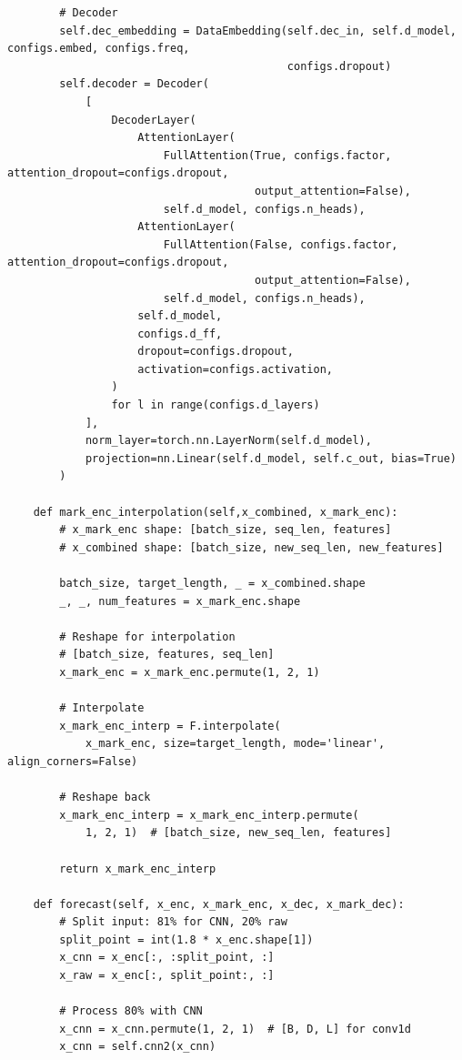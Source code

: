 \documentclass[stu,12pt,floatsintext]{apa7}
\begin{document}
\begin{verbatim}
        # Decoder
        self.dec_embedding = DataEmbedding(self.dec_in, self.d_model, configs.embed, configs.freq,
                                           configs.dropout)
        self.decoder = Decoder(
            [
                DecoderLayer(
                    AttentionLayer(
                        FullAttention(True, configs.factor, attention_dropout=configs.dropout,
                                      output_attention=False),
                        self.d_model, configs.n_heads),
                    AttentionLayer(
                        FullAttention(False, configs.factor, attention_dropout=configs.dropout,
                                      output_attention=False),
                        self.d_model, configs.n_heads),
                    self.d_model,
                    configs.d_ff,
                    dropout=configs.dropout,
                    activation=configs.activation,
                )
                for l in range(configs.d_layers)
            ],
            norm_layer=torch.nn.LayerNorm(self.d_model),
            projection=nn.Linear(self.d_model, self.c_out, bias=True)
        )

    def mark_enc_interpolation(self,x_combined, x_mark_enc):
        # x_mark_enc shape: [batch_size, seq_len, features]
        # x_combined shape: [batch_size, new_seq_len, new_features]

        batch_size, target_length, _ = x_combined.shape
        _, _, num_features = x_mark_enc.shape

        # Reshape for interpolation
        # [batch_size, features, seq_len]
        x_mark_enc = x_mark_enc.permute(1, 2, 1)

        # Interpolate
        x_mark_enc_interp = F.interpolate(
            x_mark_enc, size=target_length, mode='linear', align_corners=False)

        # Reshape back
        x_mark_enc_interp = x_mark_enc_interp.permute(
            1, 2, 1)  # [batch_size, new_seq_len, features]

        return x_mark_enc_interp

    def forecast(self, x_enc, x_mark_enc, x_dec, x_mark_dec):
        # Split input: 81% for CNN, 20% raw
        split_point = int(1.8 * x_enc.shape[1])
        x_cnn = x_enc[:, :split_point, :]
        x_raw = x_enc[:, split_point:, :]

        # Process 80% with CNN
        x_cnn = x_cnn.permute(1, 2, 1)  # [B, D, L] for conv1d
        x_cnn = self.cnn2(x_cnn)


\end{verbatim}
\end{document}
